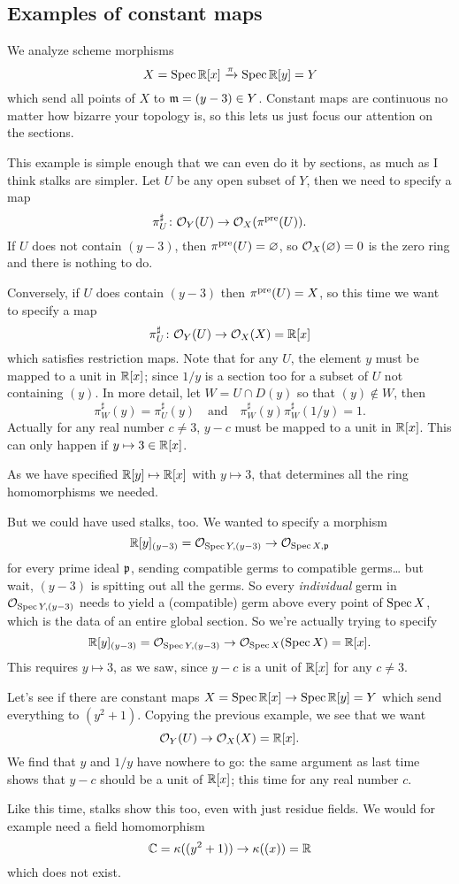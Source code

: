 \subsection{Examples of constant maps}
\begin{example}
	We analyze scheme morphisms
	\[ X = \operatorname{Spec} \mathbb R[x] \xrightarrow{\pi} \operatorname{Spec} \mathbb R[y] = Y \]
	which send all points of $X$ to $\mathfrak m = (y-3) \in Y$.
	Constant maps are continuous no matter how bizarre your topology is,
	so this lets us just focus our attention on the sections.

	This example is simple enough that we can even do it by sections,
	as much as I think stalks are simpler.
	Let $U$ be any open subset of $Y$, then we need to specify a map
	\[ \pi^\sharp_U \colon \mathcal O_Y(U) \to \mathcal O_X(\pi^{\text{pre}}(U)). \]
	If $U$ does not contain $(y-3)$, then $\pi^{\text{pre}}(U) = \varnothing$,
	so $\mathcal O_X(\varnothing) = 0$ is the zero ring and there is nothing to do.

	Conversely, if $U$ does contain $(y-3)$ then $\pi^{\text{pre}}(U) = X$,
	so this time we want to specify a map
	\[ \pi^\sharp_U \colon \mathcal O_Y(U) \to \mathcal O_X(X) = \mathbb R[x] \]
	which satisfies restriction maps.
	Note that for any $U$, the element $y$ must be mapped to a unit in $\mathbb R[x]$;
	since $1/y$ is a section too for a subset of $U$ not containing $(y)$.
	In more detail, let $W = U \cap D(y)$ so that $(y) \notin W$, then
	\[
		\pi^\sharp_W(y) = \pi^\sharp_U(y) \quad \text{and} \quad
		\pi^\sharp_W(y) \pi^\sharp_W(1/y) = 1.
	\]
	Actually for any real number $c \neq 3$,
	$y-c$ must be mapped to a unit in $\mathbb R[x]$.
	This can only happen if $y \mapsto 3 \in \mathbb R[x]$.

	As we have specified $\mathbb R[y] \mapsto \mathbb R[x]$ with $y \mapsto 3$,
	that determines all the ring homomorphisms we needed.
\end{example}
But we could have used stalks, too.
We wanted to specify a morphism
\[ \mathbb R[y]_{(y-3)} = \mathcal O_{\operatorname{Spec} Y, (y-3)} \to \mathcal O_{\operatorname{Spec} X, \mathfrak p} \]
for every prime ideal $\mathfrak p$,
sending compatible germs to compatible germs\dots
but wait, $(y-3)$ is spitting out all the germs.
So every \emph{individual} germ in $\mathcal O_{\operatorname{Spec} Y, (y-3)}$
needs to yield a (compatible) germ above every point of $\operatorname{Spec} X$,
which is the data of an entire global section.
So we're actually trying to specify
\[ \mathbb R[y]_{(y-3)} = \mathcal O_{\operatorname{Spec} Y, (y-3)} \to \mathcal O_{\operatorname{Spec} X}(\operatorname{Spec} X) = \mathbb R[x]. \]
This requires $y \mapsto 3$, as we saw,
since $y-c$ is a unit of $\mathbb R[x]$ for any $c \neq 3$.

\begin{example}
	Let's see if there are constant maps
	$X = \operatorname{Spec} \mathbb R[x] \to \operatorname{Spec} \mathbb R[y] = Y$
	which send everything to $(y^2+1)$.
	Copying the previous example, we see that we want
	\[ \mathcal O_Y(U) \to \mathcal O_X(X) = \mathbb R[x]. \]
	We find that $y$ and $1/y$ have nowhere to go:
	the same argument as last time shows that $y-c$ should be a unit of $\mathbb R[x]$;
	this time for any real number $c$.

	Like this time, stalks show this too,
	even with just residue fields.
	We would for example need a field homomorphism
	\[ \mathbb C = \kappa( (y^2+1) ) \to \kappa( (x) ) = \mathbb R \]
	which does not exist.
\end{example}


